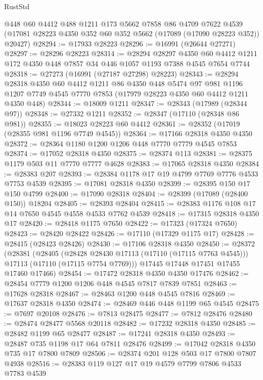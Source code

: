 \begin{lexlean}{RustStd}
\begin{coremodule}
    @448
    @60
    @4412
    @488
    @1211
    @173
    @5662
    @7858
    @86
    @4709
    @7622
    @4539
    (@17081 @28223 @4350 @352 @60 @352 @5662 (@17089 (@17090 @28223 @352)) @20427)
@28294 := @17933 @28223
@28296 := @16991 (@26644 @27271)
@28297 := @28296 @28223
@28314 := @28294
    @28297
    @4350
    @60
    @4412
    @1211
    @172
    @4350
    @448
    @7857
    @34
    @446
    @1057
    @1193
    @7388
    @4545
    @7654
    @7744
@28318 := @27273 (@16991 (@27187 @27298) @28223)
@28343 := @28294
    @28318
    @4350
    @60
    @4412
    @1211
    @86
    @4350
    @448
    @5474
    @97
    @981
    @1196
    @1207
    @7749
    @4545
    @7770
    @7853
    (@17979 @28223 @4350 @60 @4412 @1211 @4350 @448)
@28344 := @18009 @1211
@28347 := @28343 (@17989 (@28344 @97))
@28348 := @27332 @1211
@28352 := @28347 (@17110 (@28348 @86 @981))
@28355 := @18023 @28223 @60 @4412
@28361 := @28352 (@17019 (@28355 @981 @1196 @7749 @4545))
@28364 := @17166 @28318 @4350 @4350
@28372 := @28364 @1180 @1200 @1206 @448 @7770 @7779 @4545 @7853
@28374 := @17052 @28318 @4350
@28375 := @28374 @113
@28381 := @28375 @1179 @503 @11 @7770 @7777 @4628
@28383 := @17065 @28318 @4350
@28384 := @28383 @207
@28393 := @28384 @1178 @17 @19 @4799 @7769 @7776 @4533 @7753 @4539
@28395 := @17081 @28318 @4350
@28399 := @28395 @150 @17 @150 @4799
@28400 := @17090 @28318
@28404 := @28399 (@17089 (@28400 @150)) @18204
@28405 := @28393 @28404
@28415 := @28383 @1176 @108 @17 @14 @7650 @4545 @4558 @4533 @7762 @4539
@28418 := @17315 @28318 @4350 @17
@28420 := @28418 @1175 @7650
@28422 := @17323 (@17324 @7650)
@28423 := @28420 @28422
@28426 := @17110 (@17329 @1175 @17)
@28428 := @28415 (@28423 @28426)
@28430 := @17106 @28318 @4350
@28450 := @28372
    (@28381
      (@28405
        (@28428 @28430 @17113 (@17110 (@17115 @7763 @4545)))
        @17113
        (@17110 (@17115 @7754 @7769)))
      @17445
      @17448
      @17451
      @17455
      @17460
      @17466)
@28454 := @17472 @28318 @4350 @4350 @17476
@28462 := @28454 @7779 @1200 @1206 @448 @4545 @7817 @7839 @7851
@28463 := @17628 @28318
@28467 := @28463 @1200 @448 @4545 @7816
@28469 := @17637 @28318 @4350
@28474 := @28469 @446 @448 @1199 @65 @4545
@28475 := @7697 @20108
@28476 := @7813 @28475
@28477 := @7812 @28476
@28480 := @28474 @28477 @5568 @20118
@28482 := @17232 @28318 @4350
@28485 := @28482 @1199 @65 @28477
@28487 := @17241 @28318 @4350
@28493 := @28487 @735 @1198 @17 @64 @7811 @28476
@28499 := @17042 @28318 @4350 @735 @17 @7800 @7809
@28506 := @28374 @201 @128 @503 @17 @7800 @7807 @4938
@28516 := @28383 @119 @127 @17 @19 @4579 @7799 @7806 @4533 @7783 @4539

\end{coremodule}
\end{lexlean}
